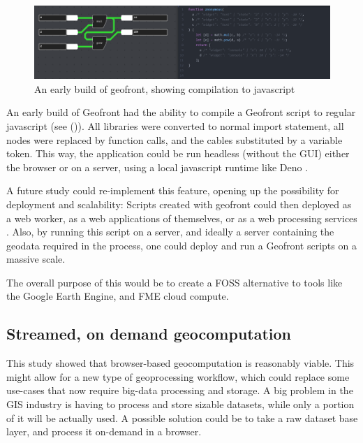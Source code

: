 \begin{figure}
  \centering
  \graphicspath{ {../../assets/images/implementation/} }
  \includegraphics[width=\linewidth]{early-geofront.png}
  \caption[Geofront to js]{An early build of geofront, showing compilation to javascript}
  \label{fig:early-geofront-compile-to-js}
\end{figure}

An early build of Geofront had the ability to compile a Geofront script to regular javascript (see ()).  
All libraries were converted to normal import statement, all nodes were replaced by function calls, and the cables substituted by a variable token. 
This way, the application could be run headless (without the \ac{GUI}) either the browser or on a server, using a local javascript runtime like Deno \citep{contributors_deno_2022}.

A future study could re-implement this feature, opening up the possibility for deployment and scalability: 
Scripts created with geofront could then deployed as a web worker, as a web applications of themselves, or as a web processing services \citep{open_geospatial_consortium_web_2015}.
Also, by running this script on a server, and ideally a server containing the geodata required in the process, one could deploy and run a Geofront scripts on a massive scale. 

The overall purpose of this would be to create a \ac{FOSS} alternative to tools like the Google Earth Engine, and FME cloud compute. 

\subsection{Streamed, on demand geocomputation}

This study showed that browser-based geocomputation is reasonably viable. 
This might allow for a new type of geoprocessing workflow, which could replace some use-cases that now require big-data processing and storage.
A big problem in the \ac{GIS} industry is having to process and store sizable datasets, while only a portion of it will be actually used. 
A possible solution could be to take a raw dataset base layer, and process it on-demand in a browser.

